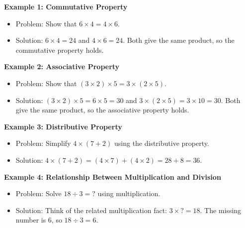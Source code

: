 \documentclass[11pt]{article}
\begin{document}
\begin{tcolorbox}[colframe=black!60, colback=white, 
coltitle=black, colbacktitle=black!15, fonttitle=\bfseries\Large, 
title=Examples, halign title=center, left=10pt, right=10pt, top=10pt, bottom=15pt]
\textbf{Example 1: Commutative Property}
\begin{itemize}
    \item Problem: Show that \(6 \times 4 = 4 \times 6\).
    \item Solution: \(6 \times 4 = 24\) and \(4 \times 6 = 24\). Both give the same product, so the commutative property holds.
\end{itemize}

\textbf{Example 2: Associative Property}
\begin{itemize}
    \item Problem: Show that \((3 \times 2) \times 5 = 3 \times (2 \times 5)\).
    \item Solution: \((3 \times 2) \times 5 = 6 \times 5 = 30\) and \(3 \times (2 \times 5) = 3 \times 10 = 30\). Both give the same product, so the associative property holds.
\end{itemize}

\textbf{Example 3: Distributive Property}
\begin{itemize}
    \item Problem: Simplify \(4 \times (7 + 2)\) using the distributive property.
    \item Solution: \(4 \times (7 + 2) = (4 \times 7) + (4 \times 2) = 28 + 8 = 36\).
\end{itemize}

\textbf{Example 4: Relationship Between Multiplication and Division}
\begin{itemize}
    \item Problem: Solve \(18 \div 3 = ?\) using multiplication.
    \item Solution: Think of the related multiplication fact: \(3 \times ? = 18\). The missing number is \(6\), so \(18 \div 3 = 6\).
\end{itemize}
\end{tcolorbox}

\vspace{1em}
\end{document}
